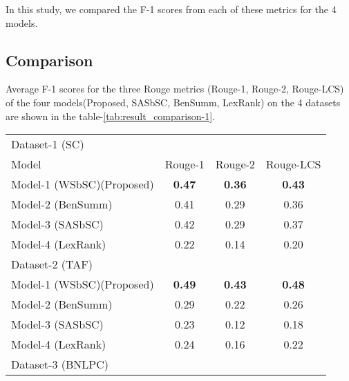 In this study, we compared the F-1 scores from each of these metrics for the 4 models.

\subsection{Comparison}\label{subsec:comparison}
Average F-1 scores for the three Rouge metrics (Rouge-1, Rouge-2, Rouge-LCS) of the four models(Proposed,
SASbSC, BenSumm, LexRank) on the 4 datasets are shown in the table-\ref{tab:result_comparison-1}. \\

\begin{table}[]
    \centering
    \begin{tabular}{lccc} \hline
         Dataset-1 (SC)                                                 &               &               &               \\
         Model                                                          & Rouge-1       & Rouge-2       & Rouge-LCS     \\\hline
         Model-1 (WSbSC)(Proposed)                                      & \textbf{0.47} & \textbf{0.36} & \textbf{0.43} \\
         Model-2 (BenSumm)~\cite{chowdhury-etal-2021-tfidf-clustering}  & 0.41          & 0.29          & 0.36          \\
         Model-3 (SASbSC)~\cite{roychowdhury-etal-2022-spectral-base}   & 0.42          & 0.29          & 0.37          \\
         Model-4 (LexRank)~\cite{Erkan-lexRank-2004}                          & 0.22          & 0.14          & 0.20          \\\hline
         Dataset-2 (TAF)                                                &               &               &               \\\hline
         Model-1 (WSbSC)(Proposed)                                      & \textbf{0.49} & \textbf{0.43} & \textbf{0.48} \\
         Model-2 (BenSumm)~\cite{chowdhury-etal-2021-tfidf-clustering}  & 0.29          & 0.22          & 0.26          \\
         Model-3 (SASbSC)~\cite{roychowdhury-etal-2022-spectral-base}   & 0.23          & 0.12          & 0.18          \\
         Model-4 (LexRank)~\cite{Erkan-lexRank-2004}                          & 0.24          & 0.16          & 0.22          \\\hline
         Dataset-3 (BNLPC)                                              &               &               &               \\\hline

\end{tabular}
\end{table}
